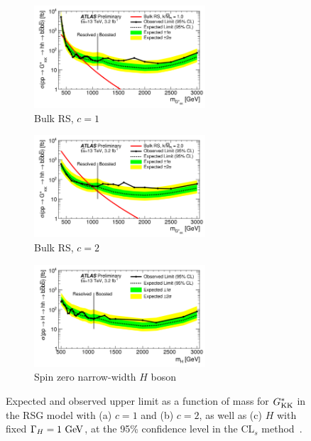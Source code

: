 \begin{figure}[!ht]
\centering
\captionsetup{justification=centering}

    \begin{subfigure}[t]{\textwidth}
        \centering
        \includegraphics[width=0.7\textwidth]{figures/Limit_RSG_c1}
        \caption{Bulk RS, $c = 1$}
    \end{subfigure}%

    \begin{subfigure}[t]{\textwidth}
        \centering
        \includegraphics[width=0.7\textwidth]{figures/Limit_RSG_c2}
        \caption{Bulk RS, $c = 2$}
    \end{subfigure}%

    \begin{subfigure}[t]{\textwidth}
        \centering
        \includegraphics[width=0.7\textwidth]{figures/Limit_H}
        \caption{Spin zero narrow-width $H$ boson}
    \end{subfigure}%
\caption{Expected and observed upper limit as a function of mass for $G^*_{\rm KK}$ in the RSG model with (a) $c = 1$
  and (b) $c = 2$, as well as (c) $H$ with fixed $\Gamma_H = 1\,\GeV{}$, at the 95\% confidence level in the CL$_{s}$ method~\cite{4bconf}.}
\label{fig:4b_limits}
\end{figure}

